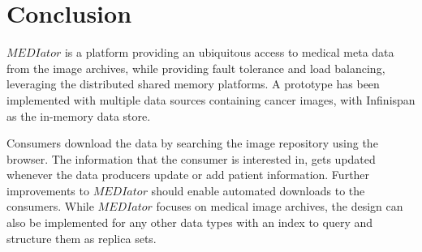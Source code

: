 \documentclass[conference]{IEEEtran}
\begin{document}
\section{Conclusion}
\balance

$MEDIator$ is a platform providing an ubiquitous access to medical meta data from the image archives, while providing fault tolerance and load balancing, leveraging the distributed shared memory platforms. A prototype has been implemented with multiple data sources containing cancer images, with Infinispan as the in-memory data store.

Consumers download the data by searching the image repository using the browser. The information that the consumer is interested in, gets updated whenever the data producers update or add patient information. Further improvements to $MEDIator$ should enable automated downloads to the consumers. While $MEDIator$ focuses on medical image archives, the design can also be implemented for any other data types with an index to query and structure them as replica sets.


\end{document}
